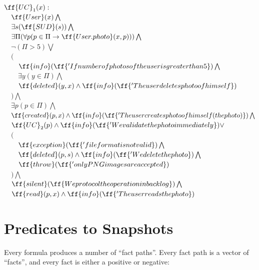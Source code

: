 \documentclass[12pt,oneside,letterpaper]{article}
\begin{document}
\begin{maths}
$\ff{UC}_1(x) : $ \\
$\quad \ff{User}(x) \bigwedge$ \\
$\quad \exists s (\ff{SUD}(s)) \bigwedge$ \\
$\quad \exists \Pi(\forall p (p \in \Pi \to \ff{User.photo}(x, p))) \bigwedge$ \\
$\quad \neg (\Pi > 5) \bigvee $ \\
$\quad ($ \\
$\quad\quad \ff{info}(\ff{'If number of photos of the user is greater than 5})\bigwedge$ \\
$\quad\quad \exists y(y \in \Pi) \bigwedge$ \\
$\quad\quad \ff{deleted}(y, x) \wedge \ff{info}(\ff{'The user deletes photo of himself})$ \\
$\quad ) \bigwedge$ \\
$\quad \exists p(p \in \Pi) \bigwedge$ \\
$\quad \ff{created}(p, x) \wedge \ff{info}(\ff{'The user creates photo of himself (the photo)})\bigwedge$ \\
$\quad \ff{UC}_2(p) \wedge \ff{info}(\ff{'We validate the photo immediately}) \vee$ \\
$\quad ($ \\
$\quad\quad \ff{exception}(\ff{'file format is not valid}) \bigwedge$ \\
$\quad\quad \ff{deleted}(p, s) \wedge \ff{info}(\ff{'We delete the photo})\bigwedge$ \\
$\quad\quad \ff{throw}(\ff{'only PNG images are accepted})$ \\
$\quad ) \bigwedge$ \\
$\quad \ff{silent}(\ff{We protocol the operation in backlog})\bigwedge$ \\
$\quad \ff{read}(p, x)\wedge \ff{info}(\ff{'The user reads the photo})$ \\
\end{maths}





\section{Predicates to Snapshots}
\label{sec:to-data}

Every formula produces a number of ``fact paths''. Every fact path
is a vector of ``facts'', and every fact is either a positive or negative:
\end{document}
